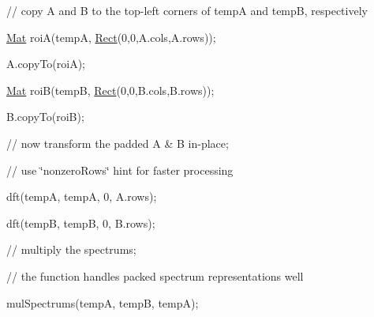 {\ttfamily // copy A and B to the top-\/left corners of tempA and tempB, respectively}

{\ttfamily }

{\ttfamily }

{\ttfamily \mbox{\hyperlink{classorg_1_1opencv_1_1core_1_1_mat}{Mat}} roiA(tempA, \mbox{\hyperlink{classorg_1_1opencv_1_1core_1_1_rect}{Rect}}(0,0,A.\+cols,A.\+rows));}

{\ttfamily }

{\ttfamily }

{\ttfamily A.\+copy\+To(roi\+A);}

{\ttfamily }

{\ttfamily }

{\ttfamily \mbox{\hyperlink{classorg_1_1opencv_1_1core_1_1_mat}{Mat}} roiB(tempB, \mbox{\hyperlink{classorg_1_1opencv_1_1core_1_1_rect}{Rect}}(0,0,B.\+cols,B.\+rows));}

{\ttfamily }

{\ttfamily }

{\ttfamily B.\+copy\+To(roi\+B);}

{\ttfamily }

{\ttfamily }

{\ttfamily // now transform the padded A \& B in-\/place;}

{\ttfamily }

{\ttfamily }

{\ttfamily // use \char`\"{}nonzero\+Rows\char`\"{} hint for faster processing}

{\ttfamily }

{\ttfamily }

{\ttfamily dft(tempA, tempA, 0, A.\+rows);}

{\ttfamily }

{\ttfamily }

{\ttfamily dft(tempB, tempB, 0, B.\+rows);}

{\ttfamily }

{\ttfamily }

{\ttfamily // multiply the spectrums;}

{\ttfamily }

{\ttfamily }

{\ttfamily // the function handles packed spectrum representations well}

{\ttfamily }

{\ttfamily }

{\ttfamily mul\+Spectrums(temp\+A, temp\+B, temp\+A);}

{\ttfamily }

